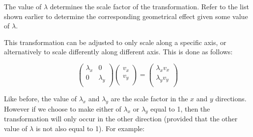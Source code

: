 \documentclass[a4paper,oneside]{report}
\begin{document}
The value of \( \lambda \) determines the scale factor of the transformation.
Refer to the list shown earlier to determine the corresponding geometrical
effect given some value of \( \lambda \).

This transformation can be adjusted to only scale along a specific axis, or
alternatively to scale differently along different axis. This is done as
follows:

\[ \begin{pmatrix}
	\lambda_x & 0 \\
	0 & \lambda_y \\
\end{pmatrix} \begin{pmatrix}
	v_x \\
	v_y \\
\end{pmatrix} = \begin{pmatrix}
	\lambda_x v_x \\
	\lambda_y v_y \\
\end{pmatrix} \]

Like before, the value of \( \lambda_x \) and \( \lambda_y \) are the scale
factor in the \( x \) and \( y \) directions. However if we choose to make
either of \( \lambda_x \) or \( \lambda_y \) equal to 1, then the
transformation will only occur in the other direction (provided that the other
value of \( \lambda \) is not also equal to 1). For example:
\end{document}
